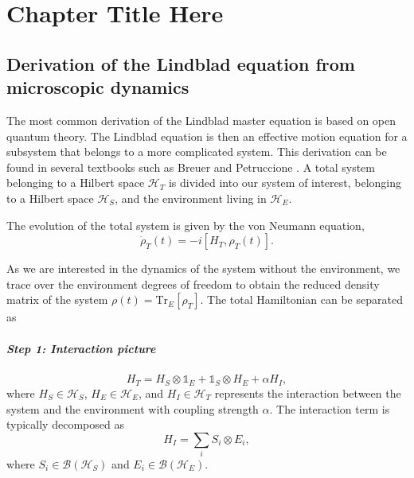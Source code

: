 
\chapter{Chapter Title Here} %

\label{ChapterX} %


\section{Derivation of the Lindblad equation from microscopic dynamics}

The most common derivation of the Lindblad master equation is based on open quantum theory. 
The Lindblad equation is then an effective motion equation for a subsystem that belongs to a more complicated system. 
This derivation can be found in several textbooks such as Breuer and Petruccione \cite{breuer_theory_2009}. 
A total system belonging to a Hilbert space $\mathcal{H}_T$ is divided into our system of interest, belonging to a Hilbert space $\mathcal{H}_S$, and the environment living in $\mathcal{H}_E$.

The evolution of the total system is given by the von Neumann equation,
\begin{equation}
    \dot{\rho}_T(t) = -i[H_T, \rho_T(t)].
\end{equation}

As we are interested in the dynamics of the system without the environment, we trace over the environment degrees of freedom to obtain the reduced density matrix of the system $\rho(t) = \mathrm{Tr}_E[\rho_T]$. The total Hamiltonian can be separated as

\paragraph{Step 1: Interaction picture}

\begin{equation}
    H_T = H_S \otimes \mathbb{1}_E + \mathbb{1}_S \otimes H_E + \alpha H_I,
\end{equation}
where $H_S \in \mathcal{H}_S$, $H_E \in \mathcal{H}_E$, and $H_I \in \mathcal{H}_T$ represents the interaction between the system and the environment with coupling strength $\alpha$. The interaction term is typically decomposed as
\begin{equation}
    H_I = \sum_i S_i \otimes E_i,
\end{equation}
where $S_i \in \mathcal{B}(\mathcal{H}_S)$ and $E_i \in \mathcal{B}(\mathcal{H}_E)$.

